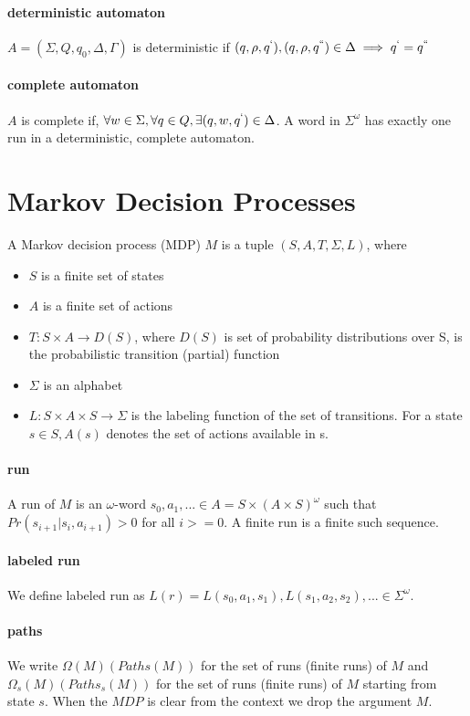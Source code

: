 \documentclass{fithesis3}
\begin{document}
		\paragraph{deterministic automaton}
		$A=(\Sigma, Q, q_0, \Delta, \Gamma)$ is deterministic if \newline$(q, \rho, q^`), (q, \rho, q^{``})\in\Delta\implies q^`=q^{``}$
		\paragraph{complete automaton}
		$A$ is complete if, $\forall w \in \Sigma, \forall q \in Q, \exists (q, w, q^`)\in\Delta$. A word in $\Sigma^\omega$ has exactly one run in a deterministic, complete automaton.
		
		\section{Markov Decision Processes}
		A Markov decision process (MDP) $M$
		is a tuple $(S, A, T, \Sigma, L)$, where
		\begin{itemize}
			\item $S$ is a finite set of states
			\item $A$ is a finite set of actions
			\item $T:S\times A \rightarrow D(S)$, where $D(S)$ is set of probability distributions over S, is  the probabilistic transition (partial) function
			\item $\Sigma$ is an alphabet
			\item $L:S\times A \times S \rightarrow \Sigma$ is the labeling function of the set of transitions.
			For a state $s \in S, A(s)$ denotes the set of actions available in s.
		\end{itemize}
		\paragraph{run}
		A run of $M$ is an $\omega$-word 
		$s_0,a_1,...\in A=S \times (A \times S)^\omega$
		such that $Pr(s_{i+1}|s_i, a_{i+1})>0$ for all $i >= 0$. A finite run is a finite such sequence.
		\paragraph{labeled run}
		We define labeled run as
		$L(r)=L(s_0,a_1,s_1), L(s_1, a_2, s_2),... \in \Sigma^\omega$.
		\paragraph{paths}
		We write $\Omega(M)(Paths(M))$
		for the set of runs (finite runs) of $M$ and
		$\Omega_s(M)(Paths_s(M))$ for the set of runs (finite runs)
		of $M$ starting from state $s$. When the $MDP$ is clear from the context we drop the argument $M$.
\end{document}
